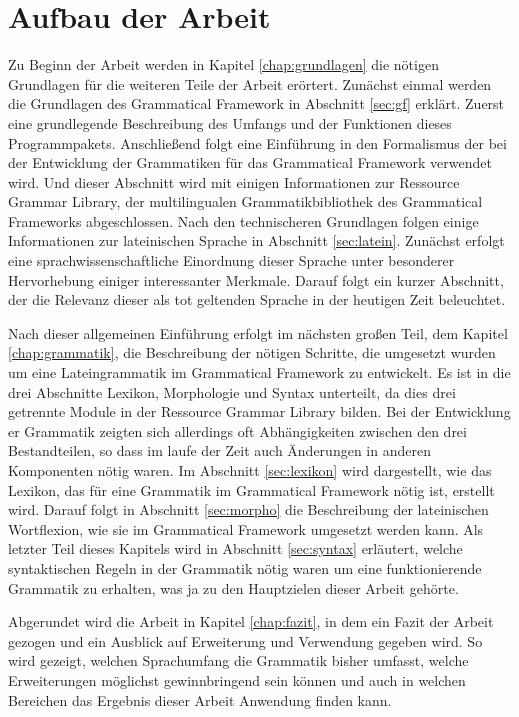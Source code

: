 \section{Aufbau der Arbeit}
\label{sec:aufbau}
Zu Beginn der Arbeit werden in Kapitel \ref{chap:grundlagen} die nötigen Grundlagen für die weiteren Teile der Arbeit erörtert. Zunächst einmal werden die Grundlagen des Grammatical Framework in Abschnitt \ref{sec:gf} erklärt. Zuerst eine grundlegende Beschreibung des Umfangs und der Funktionen dieses Programmpakets. Anschließend folgt eine Einführung in den Formalismus der bei der Entwicklung der Grammatiken für das Grammatical Framework verwendet wird. Und dieser Abschnitt wird mit einigen Informationen zur Ressource Grammar Library, der multilingualen Grammatikbibliothek des Grammatical Frameworks abgeschlossen. Nach den technischeren Grundlagen folgen einige Informationen zur lateinischen Sprache in Abschnitt \ref{sec:latein}. Zunächst erfolgt eine sprachwissenschaftliche Einordnung dieser Sprache unter besonderer Hervorhebung einiger interessanter Merkmale. Darauf folgt ein kurzer Abschnitt, der die Relevanz dieser als tot geltenden Sprache in der heutigen Zeit beleuchtet. \par
Nach dieser allgemeinen Einführung erfolgt im nächsten großen Teil, dem Kapitel \ref{chap:grammatik}, die Beschreibung der nötigen Schritte, die umgesetzt wurden um eine Lateingrammatik im Grammatical Framework zu entwickelt. Es ist in die drei Abschnitte Lexikon, Morphologie und Syntax unterteilt, da dies drei getrennte Module in der Ressource Grammar Library bilden. Bei der Entwicklung er Grammatik zeigten sich allerdings oft Abhängigkeiten zwischen den drei Bestandteilen, so dass im laufe der Zeit auch Änderungen in anderen Komponenten nötig waren. Im Abschnitt \ref{sec:lexikon} wird dargestellt, wie das Lexikon, das für eine Grammatik im Grammatical Framework nötig ist, erstellt wird. Darauf folgt in Abschnitt \ref{sec:morpho} die Beschreibung der lateinischen Wortflexion, wie sie im Grammatical Framework umgesetzt werden kann. Als letzter Teil dieses Kapitels wird in Abschnitt \ref{sec:syntax} erläutert, welche syntaktischen Regeln in der Grammatik nötig waren um eine funktionierende Grammatik zu erhalten, was ja zu den Hauptzielen dieser Arbeit gehörte. \par
Abgerundet wird die Arbeit in Kapitel \ref{chap:fazit}, in dem ein Fazit der Arbeit gezogen und ein Ausblick auf Erweiterung und Verwendung gegeben wird. So wird gezeigt, welchen Sprachumfang die Grammatik bisher umfasst, welche Erweiterungen möglichst gewinnbringend sein können und auch in welchen Bereichen das Ergebnis dieser Arbeit Anwendung finden kann.
